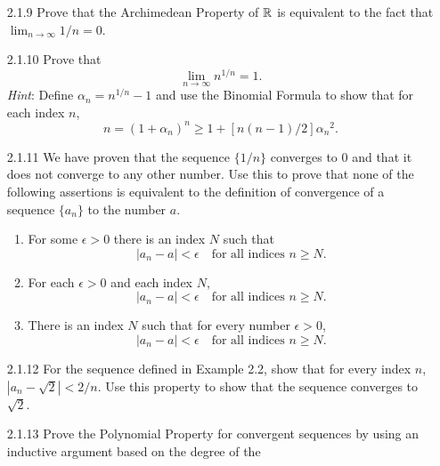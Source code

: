 \begin{enumerate}
   \item[2.1.9]   Prove that the Archimedean Property of $\mathbb{R}$ is equivalent to
                  the fact that $\lim_{n \rightarrow \infty} 1/n = 0$.
   \item[2.1.10]  Prove that
                  $$\lim_{n \rightarrow \infty} n^{1/n} = 1.$$
                  \textit{Hint}: Define $\alpha_n = n^{1/n} - 1$ and use the
                  Binomial Formula to show that for each index $n$,
                  $$n = (1 + \alpha_n)^n \ge 1 + [n(n - 1)/2]{\alpha_n}^2.$$
   \item[2.1.11]  We have proven that the sequence $\{1/n\}$ converges to 0 and
                  that it does not converge to any other number. Use this to
                  prove that none of the following assertions is equivalent to
                  the definition of convergence of a sequence $\{a_n\}$ to the
                  number $a$.
                  \begin{enumerate}
                     \item For some $\epsilon > 0$ there is an index $N$ such
                           that
                           $$|a_n - a| < \epsilon \quad\text{for all indices }
                             n \ge N.$$
                     \item For each $\epsilon > 0$ and each index $N$,
                           $$|a_n - a| < \epsilon \quad\text{for all indices }
                             n \ge N.$$
                     \item There is an index $N$ such that for every number
                           $\epsilon > 0$,
                           $$|a_n - a| < \epsilon \quad\text{for all indices }
                             n \ge N.$$
                  \end{enumerate}
   \item[2.1.12]  For the sequence defined in Example 2.2, show that for every
                  index $n$, $|a_n - \sqrt{2}| < 2/n$. Use this property to show
                  that the sequence converges to $\sqrt{2}$.
   \item[2.1.13]  Prove the Polynomial Property for convergent sequences by
                  using an inductive argument based on the degree of the

\end{enumerate}

